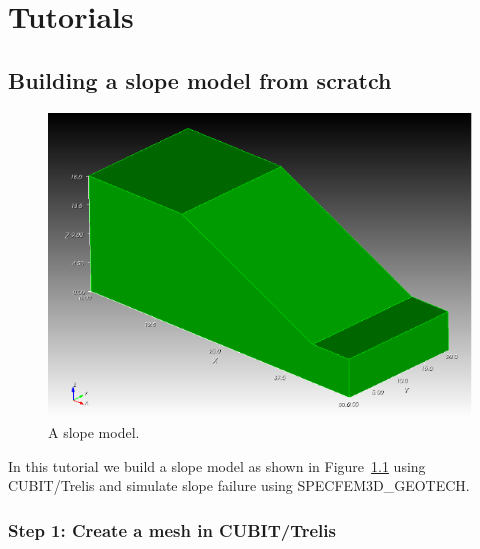 \chapter{Tutorials}
\label{chap:tutorials}

\section{Building a slope model from scratch}
\label{sec:cubit}

\begin{figure}[ht]
\centering
\includegraphics[scale=1.0]{slope_model}
\caption{A slope model.}
\label{fig:slope}
\end{figure}

In this tutorial we build a slope model as shown in Figure~\ref{fig:slope} using CUBIT/Trelis and simulate slope failure using SPECFEM3D\_GEOTECH.

\subsection*{Step 1: Create a mesh in CUBIT/Trelis}

